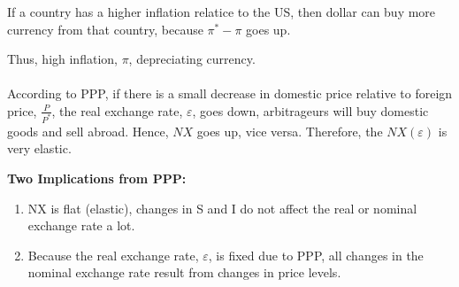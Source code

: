 \documentclass[12pt]{article}
\begin{document}
If a country has a higher inflation relatice to the US, then dollar can buy more
currency from that country, because $ \pi^{*} - \pi $ goes up.

Thus, high inflation, $ \pi $, depreciating currency.\\

\noindent{}\\


According to PPP, if there is a small decrease in domestic price relative to foreign
price, $ \frac{P}{P^{*}} $, the real exchange rate, $ \varepsilon $, goes down,
arbitrageurs will buy domestic goods and sell abroad. Hence, $ NX $ goes up, vice
versa.
Therefore, the $ NX(\varepsilon) $ is very elastic.

\begin{figure}[H]
\end{figure}

{\textbf {Two Implications from PPP:}}\\
\begin{enumerate}
		\item NX is flat (elastic), changes in S and I do not affect the real or
				nominal exchange rate a lot.
		\item Because the real exchange rate, $ \varepsilon $, is fixed due to PPP, all
				changes in the nominal exchange rate result from changes in price levels.
\end{enumerate}
\end{document}
